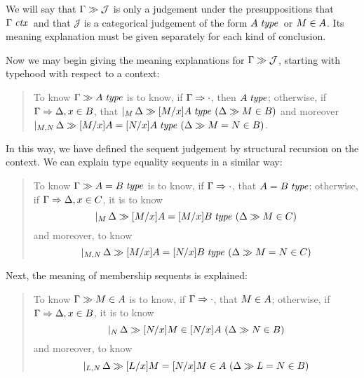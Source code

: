 \documentclass[main.tex]{subfiles}
\begin{document}
We will say that $\Gamma\gg\mathcal{J}$ is only a judgement
under the presuppositions that $\Gamma\;\mathit{ctx}$\ and that $\mathcal{J}$
is a categorical judgement of the form $A\;\mathit{type}$\ or
$M\in A$. Its meaning explanation must be given separately for
each kind of conclusion.

Now we may begin giving the meaning explanations for
$\Gamma\gg\mathcal{J}$, starting with typehood with respect to a context:

\begin{quote}

  To know $\Gamma\gg A\;\mathit{type}$ is to know, if
$\Gamma\Rightarrow\cdot$, then $A\;\mathit{type}$; otherwise, if
$\Gamma\Rightarrow\Delta,x\in B$, that
$\lvert_{M}\,\Delta\gg[M/x]A\;\mathit{type}\ (\Delta\gg M\in B)$
and moreover
$\lvert_{M,N}\,\Delta\gg[M/x]A=[N/x]A\;\mathit{type}\ (\Delta\gg M=N\in B)$.

\end{quote}

In this way, we have defined the sequent judgement by structural
recursion on the context. We can explain type equality sequents in a
similar way:

\begin{quote}
  To know $\Gamma\gg A=B\;\mathit{type}$ is to know, if $\Gamma\Rightarrow\cdot$, that $A=B\;\mathit{type}$; otherwise, if $\Gamma\Rightarrow\Delta,x\in C$, it is to know
  \[
    \genj{M}{
      \hyp{
        \sequent{\Delta}{
          \isset{
            [M/x]A=[M/x]B
          }
        }
      }{
        \sequent{\Delta}{
          \ver{M}{C}
        }
      }
    }
  \]
  and moreover, to know
  \[
    \genj{M,N}{
      \hyp{
        \sequent{\Delta}{
          \isset{[M/x]A=[N/x]B}
        }
      }{
        \sequent{\Delta}{
          \ver{M=N}{C}
        }
      }
    }
  \]
\end{quote}

Next, the meaning of membership sequents is explained:

\begin{quote}
  To know $\Gamma\gg M\in A$ is to know, if
  $\Gamma\Rightarrow\cdot$, that $M\in A$; otherwise, if
  $\Gamma\Rightarrow\Delta,x\in B$, it is to know
  \[
    \genj{N}{
      \hyp{
        \sequent{\Delta}{
          \ver{[N/x]M}{[N/x]A}
        }
      }{
        \sequent{\Delta}{
          \ver{N}{B}
        }
      }
    }
  \]
  and moreover, to know
  \[
    \genj{L,N}{
      \hyp{
        \sequent{\Delta}{
          \ver{[L/x]M=[N/x]M}{A}
        }
      }{
        \sequent{\Delta}{
          \ver{L=N}{B}
        }
      }
    }
  \]
\end{quote}
\end{document}
